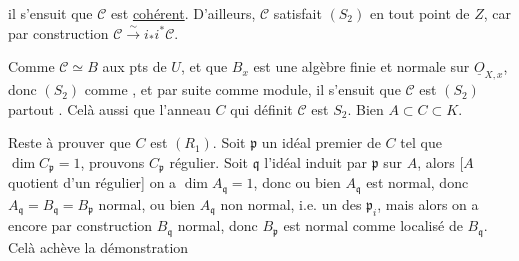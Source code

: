 il s'ensuit que $\mathcal C$ est \uline{cohérent}. D'ailleurs, $\mathcal C$ satisfait $(S_2)$ en tout point de $Z$, car  par construction $\mathcal C\overset{\sim}{\longrightarrow}i_*\!i^*\mathcal C$.

Comme $\mathcal C\simeq B$ aux pts de $U$,  et que $B_x$ est une algèbre finie et normale sur $\underline O_{X,x}$, donc $(S_2)$ comme , et par suite comme module, il s'ensuit que $\mathcal C$ est $(S_2)$ partout . Celà   aussi que l'anneau $C$ qui définit $\mathcal C$ est $S_2$. Bien  $A\subset C\subset K$.

\margin{\unsure{Inutile} le fait que, $A$ étant quotient d'un régulier, on a $\dim A_{\mathfrak q}=\dim B_{\mathfrak p}$ si $\mathfrak p\in\operatorname{Spec} B$ induit $\mathfrak q$] cf verso}

Reste à prouver que $C$ est  $(R_1)$. Soit $\mathfrak p$ un idéal premier de $C$ tel que $\dim C_{\mathfrak p}=1$, prouvons $C_{\mathfrak p}$ régulier. Soit $\mathfrak q$ l'idéal induit par $\mathfrak p$ sur $A$, alors [$A$  quotient d'un régulier] on a $\dim A_{\mathfrak q}=1$, donc ou bien $A_{\mathfrak q}$ est normal, donc $A_{\mathfrak q}=B_{\mathfrak q}=B_{\mathfrak p}$  normal, ou bien $A_{\mathfrak q}$ non normal, i.e. un des $\mathfrak p_i$, mais alors on a encore par construction $B_{\mathfrak q}$ normal, donc  $B_{\mathfrak p}$ est normal comme localisé de $B_{\mathfrak q}$. Celà achève la démonstration




